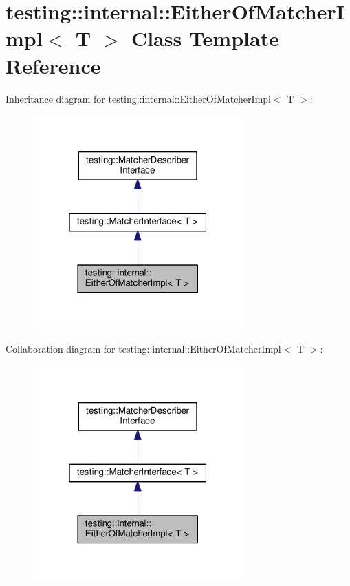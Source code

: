 \hypertarget{classtesting_1_1internal_1_1EitherOfMatcherImpl}{}\section{testing\+:\+:internal\+:\+:Either\+Of\+Matcher\+Impl$<$ T $>$ Class Template Reference}
\label{classtesting_1_1internal_1_1EitherOfMatcherImpl}


Inheritance diagram for testing\+:\+:internal\+:\+:Either\+Of\+Matcher\+Impl$<$ T $>$\+:\nopagebreak
\begin{figure}[H]
\begin{center}
\leavevmode
\includegraphics[width=229pt]{classtesting_1_1internal_1_1EitherOfMatcherImpl__inherit__graph}
\end{center}
\end{figure}


Collaboration diagram for testing\+:\+:internal\+:\+:Either\+Of\+Matcher\+Impl$<$ T $>$\+:\nopagebreak
\begin{figure}[H]
\begin{center}
\leavevmode
\includegraphics[width=229pt]{classtesting_1_1internal_1_1EitherOfMatcherImpl__coll__graph}
\end{center}
\end{figure}
